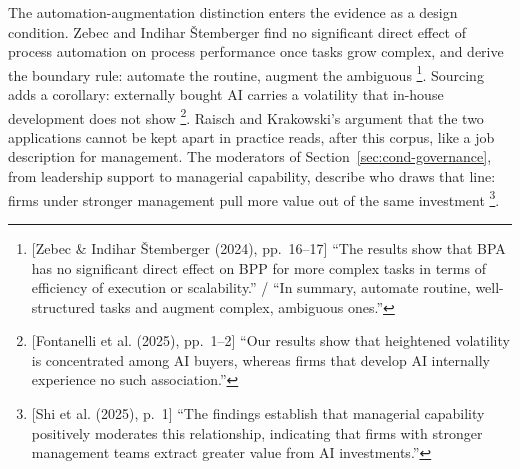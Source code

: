 The automation-augmentation distinction enters the evidence as a design condition.
Zebec and Indihar {\v S}temberger find no significant direct effect of process
automation on process performance once tasks grow complex, and derive the boundary
rule: automate the routine, augment the
ambiguous \parencite[pp.~16--17]{zebec2024creating}\footnote{[Zebec \& Indihar
{\v S}temberger (2024), pp.~16--17] ``The results show that BPA has no significant
direct effect on BPP for more complex tasks in terms of efficiency of execution or
scalability.'' / ``In summary, automate routine, well-structured tasks and augment
complex, ambiguous ones.''}. Sourcing adds a corollary: externally bought AI carries a
volatility that in-house development does not
show \parencite[pp.~1--2]{fontanelli2025predictive}\footnote{[Fontanelli et al. (2025),
pp.~1--2] ``Our results show that heightened volatility is concentrated among AI
buyers, whereas firms that develop AI internally experience no such association.''}.
Raisch and Krakowski's argument that the two applications cannot be kept apart in
practice reads, after this corpus, like a job description for management. The
moderators of Section~\ref{sec:cond-governance}, from leadership support to managerial
capability, describe who draws that line: firms under stronger management pull more
value out of the same
investment \parencite[p.~1]{shi2025value}\footnote{[Shi et al. (2025), p.~1] ``The
findings establish that managerial capability positively moderates this relationship,
indicating that firms with stronger management teams extract greater value from AI
investments.''}.

